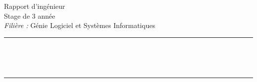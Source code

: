 \vspace*{\fill}

\begin{center}


	\Large
	Rapport d'ingénieur													\\
	Stage de 3 année											\\
	\textit{Filière :} Génie Logiciel et Systèmes Informatiques
	
	\rule{16cm}{2pt}													\\
	\vspace*{0.35cm}
	
	\huge
	\textbf{\@title}													\\

	\rule{16cm}{2pt}
	

\end{center}
	
\vspace*{\fill}

